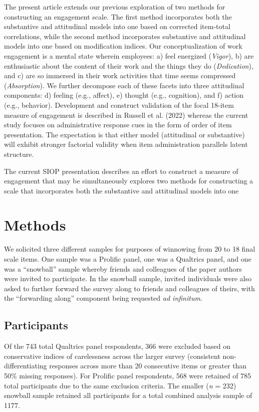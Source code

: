 \documentclass[
  man]{apa6}
\begin{document}
The present article extends our previous exploration of two methods for constructing an engagement scale. The first method incorporates both the substantive and attitudinal models into one based on corrected item-total correlations, while the second method incorporates substantive and attitudinal models into one based on modification indices. Our conceptualization of work engagement is a mental state wherein employees: a) feel energized (\emph{Vigor}), b) are enthusiastic about the content of their work and the things they do (\emph{Dedication}), and c) are so immersed in their work activities that time seems compressed (\emph{Absorption}). We further decompose each of these facets into three attitudinal components: d) feeling (e.g., affect), e) thought (e.g., cognition), and f) action (e.g., behavior). Development and construct validation of the focal 18-item measure of engagement is described in Russell et al. (2022) whereas the current study focuses on administrative response cues in the form of order of item presentation. The expectation is that either model (attitudinal or substantive) will exhibit stronger factorial validity when item administration parallels latent structure.

The current SIOP presentation describes an effort to construct a measure of engagement that may be simultaneously explores two methods for constructing a scale that incorporates both the substantive and attitudinal models into one

\hypertarget{methods}{%
\section{Methods}\label{methods}}

We solicited three different samples for purposes of winnowing from 20 to 18 final scale items. One sample was a Prolific panel, one was a Qualtrics panel, and one was a ``snowball'' sample whereby friends and colleagues of the paper authors were invited to participate. In the snowball sample, invited individuals were also asked to further forward the survey along to friends and colleagues of theirs, with the ``forwarding along'' component being requested \emph{ad infinitum}.

\hypertarget{participants}{%
\subsection{Participants}\label{participants}}

Of the 743 total Qualtrics panel respondents, 366 were excluded based on conservative indices of carelessness across the larger survey (consistent non-differentiating responses across more than 20 consecutive items or greater than 50\% missing responses). For Prolific panel respondents, 568 were retained of 785 total participants due to the same exclusion criteria. The smaller (\emph{n} = 232) snowball sample retained all participants for a total combined analysis sample of 1177.
\end{document}
